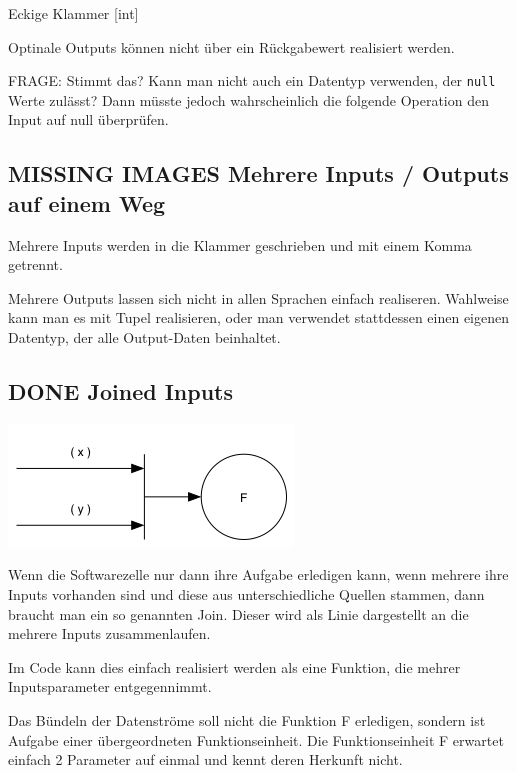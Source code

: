 \documentclass[11pt]{article}
\begin{document}
Eckige Klammer
[int]

Optinale Outputs können nicht über ein Rückgabewert realisiert werden.

FRAGE: Stimmt das? Kann man nicht auch ein Datentyp verwenden, der \texttt{null} Werte zulässt?
Dann müsste jedoch wahrscheinlich die folgende Operation den Input auf null überprüfen.

\subsection{{\bfseries\sffamily MISSING IMAGES} Mehrere Inputs / Outputs auf einem Weg}
\label{sec:orgheadline26}
Mehrere Inputs werden in die Klammer geschrieben und mit einem Komma getrennt.

Mehrere Outputs lassen sich nicht in allen Sprachen einfach realiseren.
Wahlweise kann man es mit Tupel realisieren, oder man verwendet stattdessen
einen eigenen Datentyp, der alle Output-Daten beinhaltet.

\subsection{{\bfseries\sffamily DONE} Joined Inputs}
\label{sec:orgheadline27}
\includegraphics[width=.9\linewidth]{./img/diagramJoin.png}

Wenn die Softwarezelle nur dann ihre Aufgabe erledigen kann, wenn mehrere ihre Inputs 
vorhanden sind und diese aus unterschiedliche Quellen stammen, dann braucht man ein so genannten Join.
Dieser wird als Linie dargestellt an die mehrere Inputs zusammenlaufen.

Im Code kann dies einfach realisiert werden als eine Funktion, die mehrer Inputsparameter entgegennimmt.

Das Bündeln der Datenströme soll nicht die Funktion F erledigen, sondern ist Aufgabe einer übergeordneten Funktionseinheit.
Die Funktionseinheit F erwartet einfach 2 Parameter auf einmal und kennt deren Herkunft nicht. 
\end{document}
